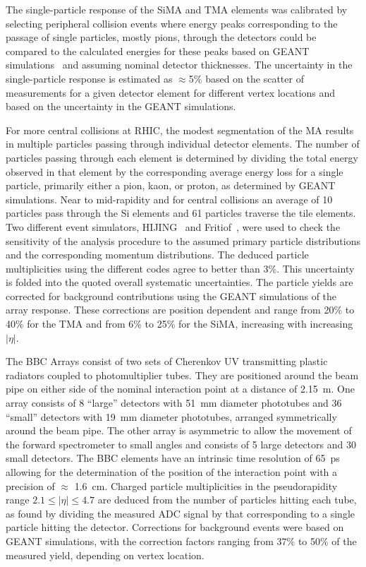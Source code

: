 \documentclass[singlespacing]{elsart}
\begin{document}
The single-particle response of the SiMA and TMA elements was calibrated
by selecting peripheral collision events
where energy peaks corresponding to the passage of single 
particles, mostly pions,  through the detectors could be compared
to the calculated energies for these peaks based on GEANT 
simulations~\cite{geant} and assuming nominal detector thicknesses. 
The uncertainty in the single-particle response
is estimated as $\approx$5\% 
based on the scatter of measurements
for a given detector element for different vertex locations and
based on the uncertainty in the GEANT simulations.    

For more central collisions at RHIC, the modest segmentation 
of the MA results in multiple particles passing
through individual detector elements. The number of particles passing
through each element is determined by dividing the total energy
observed in  that element by the corresponding average energy loss for a single
particle, primarily either a pion, kaon, or proton,  
as determined by GEANT simulations. Near to mid-rapidity and for central
collisions an average of  10 particles pass through the Si elements
and 61 particles traverse the tile elements.  
Two different event simulators, 
HIJING~\cite{wang91} and Fritiof~\cite{pi92},  
were used to check the sensitivity of the analysis
procedure to the assumed primary particle distributions and the corresponding 
momentum distributions. 
The deduced particle
multiplicities using the different codes agree to better than 3\%. This
uncertainty is folded into the quoted overall systematic uncertainties. 
The particle yields are corrected for background contributions
using the GEANT simulations of the array response.  These corrections are
position dependent and range from 20\% to 40\% for the TMA and from
6\% to 25\% for the SiMA, increasing with increasing $|\eta|$.

The BBC Arrays consist of two sets of 
Cherenkov UV transmitting plastic radiators 
coupled to photomultiplier tubes. They are positioned around the 
beam pipe on either side of the nominal interaction point at a 
distance of 2.15~m. One array consists of 8 ``large''
detectors with  51~mm 
diameter phototubes and 36 ``small'' detectors with 19~mm diameter 
phototubes, 
arranged symmetrically 
around the beam pipe. The other array is asymmetric to allow the 
movement of the forward spectrometer to small angles and consists 
of 5 large detectors and 30 small detectors. The BBC elements 
have an intrinsic time resolution of 65~ps allowing for the determination 
of the position of the interaction point with a precision of 
$\approx$ 1.6~cm. 
Charged particle
multiplicities in the pseudorapidity range $2.1\le |\eta| \le 4.7$ 
are deduced from the number of particles hitting each tube, as found
by dividing the measured ADC signal by that corresponding to a
single particle hitting the detector.  Corrections
for background events were based on GEANT simulations,
with the correction factors ranging from 37\% to  50\% of the measured yield,
depending on vertex location.
\end{document}
